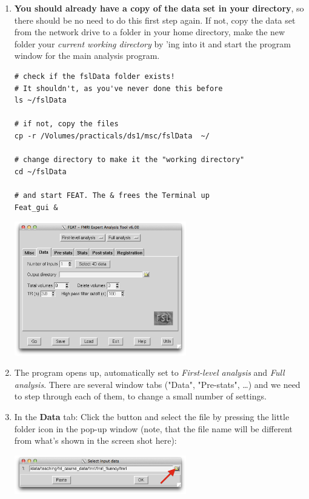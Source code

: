 \begin{enumerate}

\item  \textbf{You should already have a copy of the data set in your  directory}, so there should be no need to do this first step again. If not, copy the data set from the network drive to a folder in your home directory, make the new folder your \emph{current working directory} by 'ing into it and start the program window for the main analysis program.

\begin{lstlisting}
# check if the fslData folder exists!  
# It shouldn't, as you've never done this before
ls ~/fslData 

# if not, copy the files
cp -r /Volumes/practicals/ds1/msc/fslData  ~/

# change directory to make it the "working directory"
cd ~/fslData

# and start FEAT. The & frees the Terminal up
Feat_gui &
\end{lstlisting}

\begin{center}
\includegraphics[width=7.5cm]{FEAT-snapshot.png}
\end{center}

\item The program opens up, automatically set to \emph{First-level analysis} and \emph{Full analysis}. There are several window tabs ("Data", "Pre-stats", \dots) and we need to step through each of them, to change a small number of settings.

\item In the \textbf{Data} tab: Click the  button and select the  file by pressing the little folder icon in the pop-up window (note, that the file name will be different from what's shown in the screen shot here):

\begin{center}
\includegraphics[width=7.5cm]{feat-4d-data.png}
\end{center}


\end{enumerate}
